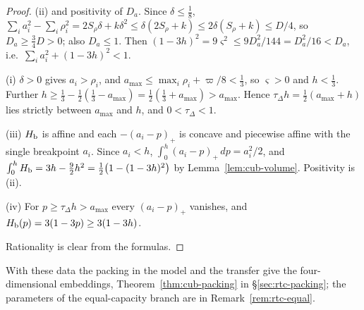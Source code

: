 \begin{proof}
(ii) and positivity of $D_a$. Since $\delta\le\frac18$,
$\sum_ia_i^2-\sum_i\rho_i^2=2S_\rho\delta+k\delta^2\le\delta(2S_\rho+k)\le2\delta(S_\rho+k)\le D/4$, so $D_a\ge\frac34D>0$; also
$D_a\le1$. Then $(1-3h)^2=9\varsigma^2\le9D_a^2/144=D_a^2/16<D_a$, i.e.\ $\sum_ia_i^2+(1-3h)^2<1$.

(i) $\delta>0$ gives $a_i>\rho_i$, and $a_{\max}\le\max_i\rho_i+\varpi/8<\frac13$, so $\varsigma>0$ and $h<\frac13$. Further
$h\ge\frac13-\frac12(\frac13-a_{\max})=\frac12(\frac13+a_{\max})>a_{\max}$. Hence $\tau_\Delta h=\frac12(a_{\max}+h)$ lies strictly
between $a_{\max}$ and $h$, and $0<\tau_\Delta<1$.

(iii) $H_{\mathrm b}$ is affine and each $-(a_i-p)_+$ is concave and piecewise affine with the single breakpoint $a_i$. Since
$a_i<h$, $\int_0^h(a_i-p)_+\,dp=a_i^2/2$, and $\int_0^hH_{\mathrm b}=3h-\frac92h^2=\frac12\big(1-(1-3h)^2\big)$ by
Lemma~\ref{lem:cub-volume}. Positivity is (ii).

(iv) For $p\ge\tau_\Delta h>a_{\max}$ every $(a_i-p)_+$ vanishes, and $H_{\mathrm b}(p)=3(1-3p)\ge3(1-3h)$.

Rationality is clear from the formulas.
\end{proof}

With these data the packing in the model and the transfer give the four-dimensional embeddings,
Theorem~\ref{thm:cub-packing} in \S\ref{sec:rtc-packing}; the parameters of the equal-capacity branch are in
Remark~\ref{rem:rtc-equal}.
